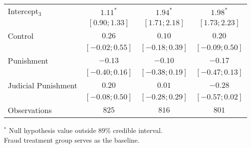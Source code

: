 \begin{table}[h]
\begin{center}
\begin{threeparttable}
\begin{tabular}{l c c c}
Intercept$_3$       & $1.11^{*}$        & $1.94^{*}$        & $1.98^{*}$        \\
                    & $ [ 0.90;  1.33]$ & $ [ 1.71;  2.18]$ & $ [ 1.73;  2.23]$ \\
Control             & $0.26$            & $0.10$            & $0.20$            \\
                    & $ [-0.02;  0.55]$ & $ [-0.18;  0.39]$ & $ [-0.09;  0.50]$ \\
Punishment          & $-0.13$           & $-0.10$           & $-0.17$           \\
                    & $ [-0.40;  0.16]$ & $ [-0.38;  0.19]$ & $ [-0.47;  0.13]$ \\
Judicial Punishment & $0.20$            & $0.01$            & $-0.28$           \\
                    & $ [-0.08;  0.50]$ & $ [-0.28;  0.29]$ & $ [-0.57;  0.02]$ \\
\hline
Observations        & $825$             & $816$             & $801$             \\
\hline
\end{tabular}
\begin{tablenotes}[flushleft]
\scriptsize{$^*$ Null hypothesis value outside 89\% credible interval.  \\
Fraud treatment group serves as the baseline.}
\end{tablenotes}
\end{threeparttable}
\label{table:ol_main_la_npol_847}
\end{center}
\end{table}
